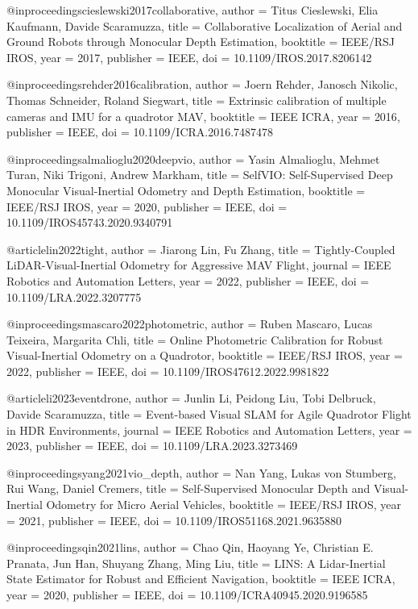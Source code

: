 @inproceedings{cieslewski2017collaborative,
  author = {Titus Cieslewski, Elia Kaufmann, Davide Scaramuzza},
  title = {Collaborative Localization of Aerial and Ground Robots through Monocular Depth Estimation},
  booktitle = {IEEE/RSJ IROS},
  year = {2017},
  publisher = {IEEE},
  doi = {10.1109/IROS.2017.8206142}
}

@inproceedings{rehder2016calibration,
  author = {Joern Rehder, Janosch Nikolic, Thomas Schneider, Roland Siegwart},
  title = {Extrinsic calibration of multiple cameras and IMU for a quadrotor MAV},
  booktitle = {IEEE ICRA},
  year = {2016},
  publisher = {IEEE},
  doi = {10.1109/ICRA.2016.7487478}
}

@inproceedings{almalioglu2020deepvio,
  author = {Yasin Almalioglu, Mehmet Turan, Niki Trigoni, Andrew Markham},
  title = {SelfVIO: Self-Supervised Deep Monocular Visual-Inertial Odometry and Depth Estimation},
  booktitle = {IEEE/RSJ IROS},
  year = {2020},
  publisher = {IEEE},
  doi = {10.1109/IROS45743.2020.9340791}
}

@article{lin2022tight,
  author = {Jiarong Lin, Fu Zhang},
  title = {Tightly-Coupled LiDAR-Visual-Inertial Odometry for Aggressive MAV Flight},
  journal = {IEEE Robotics and Automation Letters},
  year = {2022},
  publisher = {IEEE},
  doi = {10.1109/LRA.2022.3207775}
}

@inproceedings{mascaro2022photometric,
  author = {Ruben Mascaro, Lucas Teixeira, Margarita Chli},
  title = {Online Photometric Calibration for Robust Visual-Inertial Odometry on a Quadrotor},
  booktitle = {IEEE/RSJ IROS},
  year = {2022},
  publisher = {IEEE},
  doi = {10.1109/IROS47612.2022.9981822}
}

@article{li2023eventdrone,
  author = {Junlin Li, Peidong Liu, Tobi Delbruck, Davide Scaramuzza},
  title = {Event-based Visual SLAM for Agile Quadrotor Flight in HDR Environments},
  journal = {IEEE Robotics and Automation Letters},
  year = {2023},
  publisher = {IEEE},
  doi = {10.1109/LRA.2023.3273469}
}

@inproceedings{yang2021vio_depth,
  author = {Nan Yang, Lukas von Stumberg, Rui Wang, Daniel Cremers},
  title = {Self-Supervised Monocular Depth and Visual-Inertial Odometry for Micro Aerial Vehicles},
  booktitle = {IEEE/RSJ IROS},
  year = {2021},
  publisher = {IEEE},
  doi = {10.1109/IROS51168.2021.9635880}
}

@inproceedings{qin2021lins,
  author = {Chao Qin, Haoyang Ye, Christian E. Pranata, Jun Han, Shuyang Zhang, Ming Liu},
  title = {LINS: A Lidar-Inertial State Estimator for Robust and Efficient Navigation},
  booktitle = {IEEE ICRA},
  year = {2020},
  publisher = {IEEE},
  doi = {10.1109/ICRA40945.2020.9196585}
}


